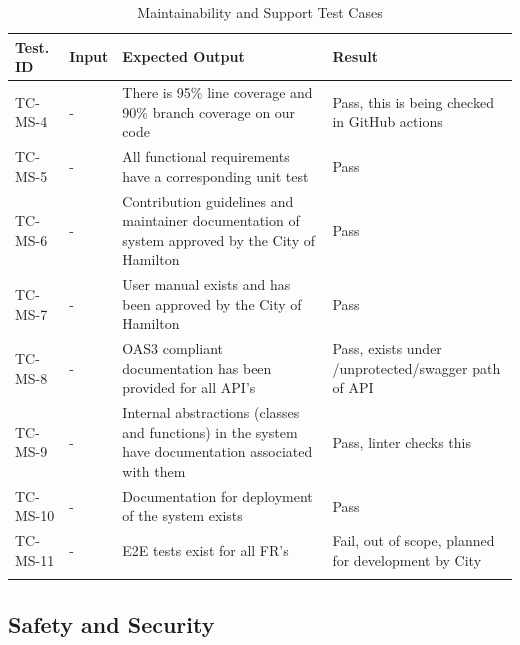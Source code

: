 \documentclass[12pt, titlepage]{article}
\begin{document}
\begin{longtable}{|m{2cm}|m{1cm}|m{6cm}|m{3cm}|}
  \hline
  \textbf{Test. ID} & \textbf{Input} & \textbf{Expected Output} &
  \textbf{Result} \\
  \hline
  TC-MS-4 & - & There is 95\% line coverage and 90\% branch coverage
  on our code & Pass, this is being checked in GitHub actions\\ \hline
  TC-MS-5 & - & All functional requirements have a corresponding unit
  test & Pass\\ \hline
  TC-MS-6 & - & Contribution guidelines and maintainer documentation
  of system approved by the City of Hamilton & Pass\\ \hline
  TC-MS-7 & - & User manual exists and has been approved by the City
  of Hamilton & Pass\\ \hline
  TC-MS-8 & - & OAS3 compliant documentation has been provided for
  all API's & Pass, exists under /unprotected/swagger path of API\\ \hline
  TC-MS-9 & - & Internal abstractions (classes and functions) in the
  system have documentation associated with them & Pass, linter
  checks this\\ \hline
  TC-MS-10 & - & Documentation for deployment of the system exists &
  Pass\\ \hline
  TC-MS-11 & - & E2E tests exist for all FR's &
  Fail, out of scope, planned for development by City\\ \hline
  \caption{Maintainability and Support Test Cases}
\end{longtable}

\subsection{Safety and Security}
\end{document}
